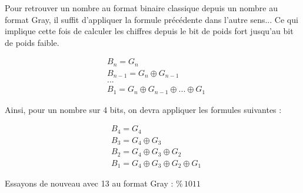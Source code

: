 \documentclass[11pt,a4paper]{article}
\begin{document}
Pour retrouver un nombre au format binaire classique depuis un nombre au format Gray, il suffit d'appliquer la formule précédente dans l'autre sens...
Ce qui implique cette fois de calculer les chiffres depuis le bit de poids fort jusqu'au bit de poids faible.

\begin{align*}
& B_{n} = G_{n} \\
& B_{n-1} = G_{n} \oplus G_{n-1} \\
& ... \\
& B_{1} = G_{n} \oplus G_{n-1} \oplus ... \oplus G_{1}
\end{align*}

\medskip

Ainsi, pour un nombre sur 4 bits, on devra appliquer les formules suivantes :

\begin{align*}
& B_{4} = G_{4} \\
& B_{3} = G_{4} \oplus G_{3} \\
& B_{2} = G_{4} \oplus G_{3} \oplus G_{2} \\
& B_{1} = G_{4} \oplus G_{3} \oplus G_{2} \oplus G_{1}
\end{align*}

\medskip

Essayons de nouveau avec 13 au format Gray : $ \text{\%} \, 1011 $
\end{document}
